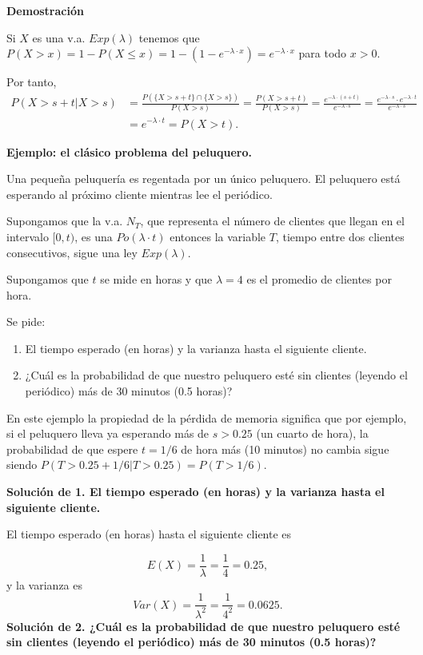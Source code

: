 \documentclass[]{book}
\providecommand{\tightlist}{%
  \setlength{\itemsep}{0pt}\setlength{\parskip}{0pt}}
\begin{document}
\textbf{Demostración}

Si \(X\) es una v.a. \(Exp(\lambda)\) tenemos que \(P(X>x)=1-P(X\leq x)=1-(1-e^{-\lambda\cdot x})=e^{-\lambda\cdot x}\) para todo \(x>0\).

Por tanto,
\[
\begin{array}{rl}
P(X>s+t\big|X>s) & =\frac{P(\{X>s+t\}\cap \{X>s\})}{P(X>s)}=\frac{P(X>s+t)}{P(X>s)}=\frac{e^{-\lambda\cdot (s+t)}}{e^{-\lambda\cdot s}}=
\frac{e^{-\lambda\cdot s}\cdot e^{-\lambda\cdot t} }{e^{-\lambda\cdot s}}\\ & =e^{-\lambda\cdot t}=P(X>t).
\end{array}
\]

\textbf{Ejemplo: el clásico problema del peluquero.}

Una pequeña peluquería es regentada por un único peluquero. El peluquero está esperando al próximo cliente mientras lee el periódico.

Supongamos que la v.a. \(N_T\), que representa el número de clientes que llegan en el intervalo \([0,t)\), es una \(Po(\lambda\cdot t)\) entonces la variable \(T\), tiempo entre dos clientes consecutivos, sigue una ley \(Exp(\lambda)\).

Supongamos que \(t\) se mide en horas y que \(\lambda=4\) es el promedio de clientes por hora.

Se pide:

\begin{enumerate}
\def\labelenumi{\arabic{enumi}.}
\tightlist
\item
  El tiempo esperado (en horas) y la varianza hasta el siguiente cliente.
\item
  ¿Cuál es la probabilidad de que nuestro peluquero esté sin clientes (leyendo el periódico) más de 30 minutos (0.5 horas)?
\end{enumerate}

En este ejemplo la propiedad de la pérdida de memoria significa que
por ejemplo, si el peluquero lleva ya esperando más de \(s>0.25\) (un cuarto de hora), la probabilidad de que espere \(t=1/6\) de hora más (10 minutos) no cambia sigue siendo \(P(T>0.25+1/6|T>0.25)=P(T>1/6).\)

\textbf{Solución de 1. El tiempo esperado (en horas) y la varianza hasta el siguiente cliente.}

El tiempo esperado (en horas) hasta el siguiente cliente es

\[
E(X)=\frac{1}{\lambda}=\frac{1}{4}=0.25,
\]
y la varianza es
\[
Var(X)=\frac{1}{\lambda^2}=\frac{1}{4^2}=0.0625.
\]
\textbf{Solución de 2. ¿Cuál es la probabilidad de que nuestro peluquero esté sin clientes (leyendo el periódico) más de 30 minutos (0.5 horas)?}
\end{document}

